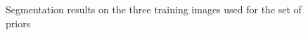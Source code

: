 \documentclass{article} %
\begin{document}
\begin{figure}[htbp]
\centering
{}
\caption{Segmentation results on the three training images used for the set of priors}
\label{ResultsTraining}
\end{figure}
\end{document}
